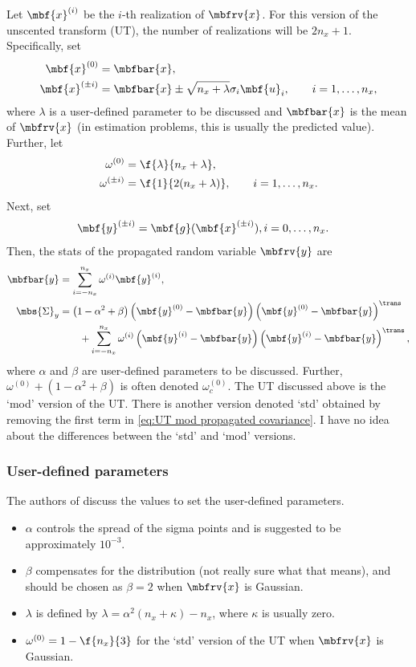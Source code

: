 Let $\mbf{x}^{(i)}$ be the $i$-th realization of $\mbfrv{x}$. For this version of the unscented transform (UT), the number of realizations will be $2n_{x}+1$. Specifically, set
\begin{align}
    \mbf{x}^{(0)} &= \mbfbar{x}, \\
    \mbf{x}^{(\pm i)} &= \mbfbar{x} \pm \sqrt{n_{x} + \lambda} \sigma_{i}\mbf{u}_{i}, \qquad i=1,\ldots,n_{x},
\end{align}
where $\lambda$ is a user-defined parameter to be discussed and $\mbfbar{x}$ is the mean of $\mbfrv{x}$ (in estimation problems, this is usually the predicted value). 
Further, let 
\begin{align}
    \omega^{(0)} &= \f{\lambda}{n_{x} + \lambda}, \\
    \omega^{(\pm i)} &= \f{1}{2(n_{x}+\lambda)}, \qquad i=1,\ldots,n_{x}.
\end{align}
Next, set
\begin{align}
    \mbf{y}^{(\pm i)} &= \mbf{g}(\mbf{x}^{(\pm i)}), i = 0, \ldots, n_{x}.
\end{align}
Then, the stats of the propagated random variable $\mbfrv{y}$ are
\begin{align}
    \mbfbar{y} &= \sum_{i=-n_{x}}^{n_{x}} \omega^{(i)}\mbf{y}^{(i)},\\
    \label{eq:UT mod propagated covariance}
    \mbs{\Sigma}_{y} &= \left( 1-\alpha^{2}+\beta\right)\left( \mbf{y}^{(0)}-\mbfbar{y} \right)\left( \mbf{y}^{(0)}-\mbfbar{y} \right)^{\trans} \\
    &\qquad +\sum_{i=-n_{x}}^{n_{x}} \omega^{(i)}\left( \mbf{y}^{(i)}-\mbfbar{y} \right)\left( \mbf{y}^{(i)}-\mbfbar{y} \right)^{\trans},
\end{align}
where $\alpha$ and $\beta$ are user-defined parameters to be discussed. Further, $\omega^{(0)}+(1-\alpha^{2}+\beta)$ is often denoted $\omega^{(0)}_{c}$. The UT discussed above is the `mod' version of the UT. There is another version denoted `std' obtained by removing the first term in \eqref{eq:UT mod propagated covariance}. I have no idea about the differences between the `std' and `mod' versions.

\subsubsection*{User-defined parameters}
The authors of \cite{gustafssonNonlinearTransformationsStochastic2008} discuss the values to set the user-defined parameters. 
\begin{itemize}
    \item $\alpha$ controls the spread of the sigma points and is suggested to be approximately $10^{-3}$.
    \item $\beta$ compensates for the distribution (not really sure what that means), and should be chosen as $\beta=2$ when $\mbfrv{x}$ is Gaussian.
    \item $\lambda$ is defined by $\lambda = \alpha^{2}\left( n_{x}+\kappa \right)-n_{x}$, where $\kappa$ is usually zero.
    \item $\omega^{(0)} = 1 - \f{n_{x}}{3}$ for the `std' version of the UT when $\mbfrv{x}$ is Gaussian.
\end{itemize}

